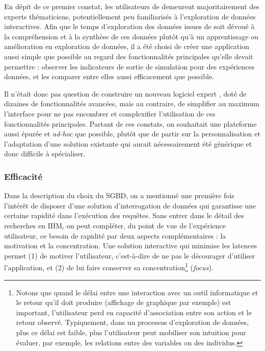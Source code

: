 En dépit de ce premier constat, les utilisateurs de \simedb{} demeurent majoritairement des experts thématiciens, potentiellement peu familiarisés à l'exploration de données interactives.
Afin que le temps d'exploration des données issues de \simfeodal{} soit dévoué à la compréhension et à la synthèse de ces données plutôt qu'à un apprentissage ou amélioration en exploration de données, il a été choisi de créer une application aussi simple que possible au regard des fonctionnalités principales qu'elle devait permettre : observer les indicateurs de sortie de simulation pour des expériences données, et les comparer entre elles aussi efficacement que possible.

Il n'était donc pas question de construire un nouveau \og logiciel expert \fg{}, doté de dizaines de fonctionnalités avancées, mais au contraire, de simplifier au maximum l'interface pour ne pas encombrer et complexifier l'utilisation de ces fonctionnalités principales.
Partant de ces constats, on souhaitait une plateforme aussi épurée et \textit{ad-hoc} que possible, plutôt que de partir sur la personnalisation et l'adaptation d'une solution existante qui aurait nécessairement été générique et donc difficile à spécialiser.


\subsubsection{Efficacité}

Dans la description du choix du SGBD, on a mentionné une première fois l'intérêt de disposer d'une solution d'interrogation de données qui garantisse une certaine rapidité dans l'exécution des requêtes.
Sans entrer dans le détail des recherches en IHM, on peut compléter, du point de vue de l'expérience utilisateur, ce besoin de rapidité par deux aspects complémentaires : la motivation et la concentration.
Une solution interactive qui minimise les latences permet (1) de motiver l'utilisateur, c'est-à-dire de ne pas le décourager d'utiliser l'application, et (2) de lui faire conserver sa concentration\footnote{
	Notons que quand le délai entre une interaction avec un outil informatique et le retour qu'il doit produire (affichage de graphique par exemple) est important, l'utilisateur perd en capacité d'association entre son action et le retour observé.
	Typiquement, dans un processus d'exploration de données, plus ce délai est faible, plus l'utilisateur peut mobiliser son intuition pour évaluer, par exemple, les relations entre des variables ou des individus.
} (\textit{focus}).

